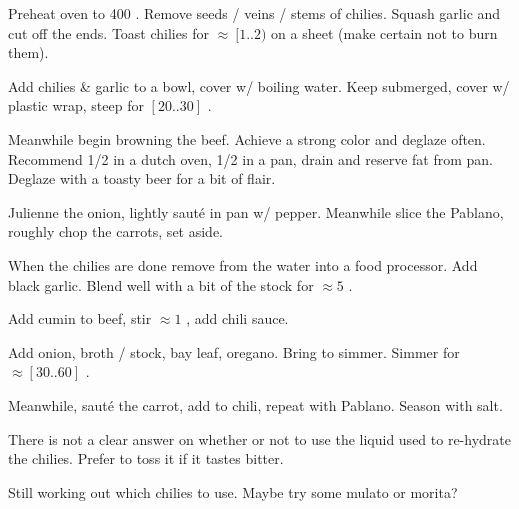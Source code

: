 \begin{preparation}
\item Preheat oven to 400 \Fahrenheit.
	Remove seeds / veins / stems of chilies.
	Squash garlic and cut off the ends.
	Toast chilies for $\approx~[1..2)$ on a sheet (make certain not to burn them).

\item Add chilies \& garlic to a bowl, cover w/ boiling water.
	Keep submerged, cover w/ plastic wrap, steep for $[20..30]$ \minute.

\item Meanwhile begin browning the beef.
	Achieve a strong color and deglaze often.
	Recommend 1/2 in a dutch oven, 1/2 in a pan, drain and reserve fat from pan.
	Deglaze with a toasty beer for a bit of flair.

\item Julienne the onion, lightly saut\'{e} in pan w/ pepper.
	Meanwhile slice the Pablano, roughly chop the carrots, set aside.

\item When the chilies are done remove from the water into a food processor.
	Add black garlic.
	Blend well with a bit of the stock for $\approx5$ \minute.

\item Add cumin to beef, stir $\approx 1$ \minute, add chili sauce.

\item Add onion, broth / stock, bay leaf, oregano.
	Bring to simmer.
	Simmer for $\approx[30..60]$ \minute.

\item Meanwhile, saut\'{e} the carrot, add to chili, repeat with Pablano.
	Season with salt.
\end{preparation}


\begin{variation}
\item There is not a clear answer on whether or not to use the liquid used to re-hydrate the chilies.
	Prefer to toss it if it tastes bitter.
\end{variation}


\begin{experiments}
\item Still working out which chilies to use.
	Maybe try some mulato or morita?
\end{experiments}


\recipeend
